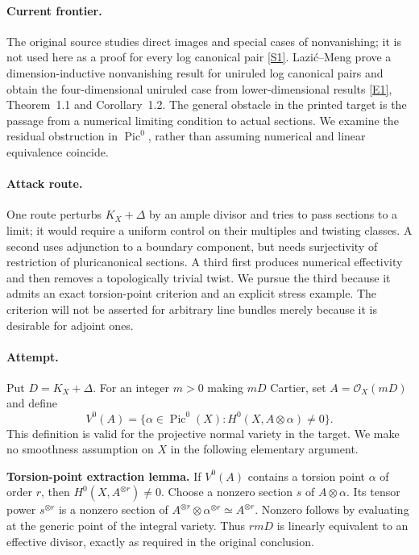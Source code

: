 \documentclass[11pt,a4paper]{article}
\newcommand{\sref}[2]{\hyperlink{source:#1:#2}{[S#2]}}
\newcommand{\eref}[2]{\hyperlink{extra:#1:#2}{[E#2]}}
\numberwithin{equation}{section}
\begin{document}
\paragraph{Current frontier.}
The original source studies direct images and special cases of nonvanishing; it is not used here as a proof for every log canonical pair \sref{30006784}{1}. Lazi\'c--Meng prove a dimension-inductive nonvanishing result for uniruled log canonical pairs and obtain the four-dimensional uniruled case from lower-dimensional results \eref{30006784}{1}, Theorem~1.1 and Corollary~1.2. The general obstacle in the printed target is the passage from a numerical limiting condition to actual sections. We examine the residual obstruction in $\operatorname{Pic}^0$, rather than assuming numerical and linear equivalence coincide.

\paragraph{Attack route.}
One route perturbs $K_X+\Delta$ by an ample divisor and tries to pass sections to a limit; it would require a uniform control on their multiples and twisting classes. A second uses adjunction to a boundary component, but needs surjectivity of restriction of pluricanonical sections. A third first produces numerical effectivity and then removes a topologically trivial twist. We pursue the third because it admits an exact torsion-point criterion and an explicit stress example. The criterion will not be asserted for arbitrary line bundles merely because it is desirable for adjoint ones.

\paragraph{Attempt.}
Put $D=K_X+\Delta$. For an integer $m>0$ making $mD$ Cartier, set $A=\mathcal O_X(mD)$ and define
\[
 V^0(A)=\{\alpha\in\operatorname{Pic}^0(X):H^0(X,A\otimes\alpha)\ne0\}.
\]
This definition is valid for the projective normal variety in the target. We make no smoothness assumption on $X$ in the following elementary argument.

\textbf{Torsion-point extraction lemma.} If $V^0(A)$ contains a torsion point $\alpha$ of order $r$, then $H^0(X,A^{\otimes r})\ne0$.
Choose a nonzero section $s$ of $A\otimes\alpha$. Its tensor power $s^{\otimes r}$ is a nonzero section of $A^{\otimes r}\otimes\alpha^{\otimes r}\simeq A^{\otimes r}$. Nonzero follows by evaluating at the generic point of the integral variety. Thus $rmD$ is linearly equivalent to an effective divisor, exactly as required in the original conclusion.
\end{document}
